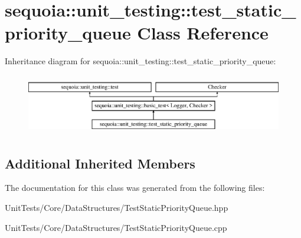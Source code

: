 \hypertarget{classsequoia_1_1unit__testing_1_1test__static__priority__queue}{}\section{sequoia\+::unit\+\_\+testing\+::test\+\_\+static\+\_\+priority\+\_\+queue Class Reference}
\label{classsequoia_1_1unit__testing_1_1test__static__priority__queue}
Inheritance diagram for sequoia\+::unit\+\_\+testing\+::test\+\_\+static\+\_\+priority\+\_\+queue\+:\begin{figure}[H]
\begin{center}
\leavevmode
\includegraphics[height=2.666667cm]{classsequoia_1_1unit__testing_1_1test__static__priority__queue}
\end{center}
\end{figure}
\subsection*{Additional Inherited Members}


The documentation for this class was generated from the following files\+:\begin{DoxyCompactItemize}
\item 
Unit\+Tests/\+Core/\+Data\+Structures/Test\+Static\+Priority\+Queue.\+hpp\item 
Unit\+Tests/\+Core/\+Data\+Structures/Test\+Static\+Priority\+Queue.\+cpp\end{DoxyCompactItemize}
